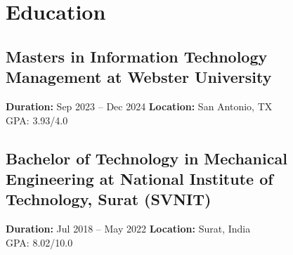 \documentclass[10pt]{article}
\begin{document}
\section*{Education}
\subsection*{Masters in Information Technology Management at Webster University}
\textbf{Duration:} Sep 2023 -- Dec 2024\quad
\textbf{Location:} San Antonio, TX\\
GPA: 3.93/4.0\par
\subsection*{Bachelor of Technology in Mechanical Engineering at National Institute of Technology, Surat (SVNIT)}
\textbf{Duration:} Jul 2018 -- May 2022\quad
\textbf{Location:} Surat, India\\
GPA: 8.02/10.0\par
\end{document}
